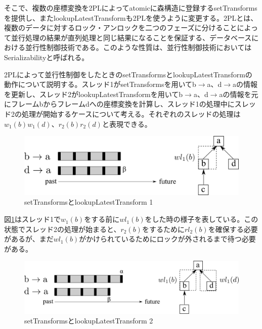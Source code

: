 \documentclass[a4paper]{jreport}	%
\begin{document}

そこで、複数の座標変換を2PLによってatomicに森構造に登録するsetTransformsを提供し、またlookupLatestTransformも2PLを使うように変更する。2PL\cite{2PL}とは、複数のデータに対するロック・アンロックを二つのフェーズに分けることによって並行処理の結果が直列処理と同じ結果になることを保証する、データベースにおける並行性制御技術である。このような性質は、並行性制御技術においてはSerializabilityと呼ばれる。


2PLによって並行性制御をしたときのsetTransformsとlookupLatestTransformの動作について説明する。スレッド1がsetTransformsを用いてb$\rightarrow$a、d$\rightarrow$aの情報を更新し、スレッド2がlookupLatestTransformを用いてb$\rightarrow$a、d$\rightarrow$aの情報を元にフレームbからフレームdへの座標変換を計算し、スレッド1の処理中にスレッド2の処理が開始するケースについて考える。それぞれのスレッドの処理は$w_1(b)w_1(d)$、$r_2(b)r_2(d)$と表現できる。

\begin{figure}[h] 
\centering
\includegraphics[width=12cm]{setTransforms1}
\caption{setTransformsとlookupLatestTransform 1}
\label{fig:setTransforms1}
\end{figure}

図\ref{fig:setTransforms1}はスレッド1で$w_1(b)$をする前に$wl_1(b)$をした時の様子を表している。この状態でスレッド2の処理が始まると、$r_2(b)$をするために$rl_2(b)$を確保する必要があるが、まだ$wl_1(b)$がかけられているためにロックが外されるまで待つ必要がある。

\begin{figure}[h] 
\centering
\includegraphics[width=12cm]{setTransforms2}
\caption{setTransformsとlookupLatestTransform 2}
\label{fig:setTransforms2}
\end{figure}
\end{document}
